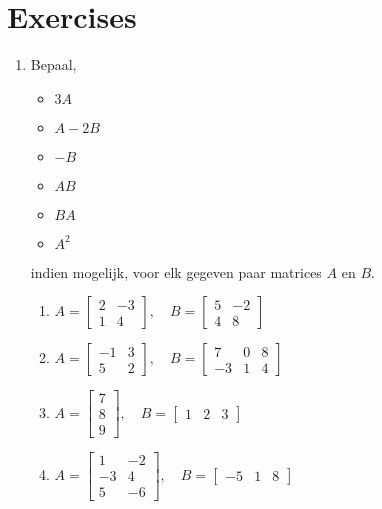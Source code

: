 \section{Exercises}
\begin{enumerate}

\item Bepaal,
	\begin{multicols}{3}
		\begin{itemize}
			\item $3A$
			\item $A-2B$
			\item $-B$
			\item $AB$
			\item $BA$
			\item $A^2$
		\end{itemize}
	\end{multicols}	
	indien mogelijk, voor elk gegeven paar matrices $A$ en $B$. %
	\begin{multicols}{2}
		\begin{enumerate}
			\item $A =\begin{bmatrix} 2 & -3 \\1 & 4  \end{bmatrix}, \quad B=\begin{bmatrix} 5 & -2 \\ 4 & 8  \end{bmatrix} $ 
			\item $A =\begin{bmatrix} -1 & 3 \\5 & 2  \end{bmatrix}, \quad B=\begin{bmatrix} 7 & 0 & 8 \\ -3 & 1 & 4  \end{bmatrix} $ 
			\item $A =\begin{bmatrix} 7 \\ 8 \\ 9  \end{bmatrix}, \quad B=\begin{bmatrix} 1 & 2 & 3 \end{bmatrix} $ 
			\item $A =\begin{bmatrix} 1 & -2 \\ -3 & 4 \\ 5 & -6  \end{bmatrix}, \quad B=\begin{bmatrix} -5 & 1 & 8  \end{bmatrix} $ 	
		\end{enumerate}
	\end{multicols}
	

\end{enumerate}
